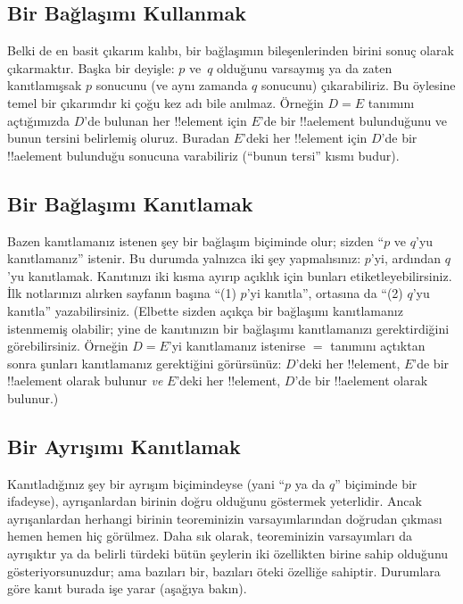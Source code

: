 \subsection{Bir Bağlaşımı Kullanmak}

Belki de en basit çıkarım kalıbı, bir bağlaşımın bileşenlerinden birini
sonuç olarak çıkarmaktır. Başka bir deyişle: $p$ ve~$q$ olduğunu
varsaymış ya da zaten kanıtlamışsak $p$ sonucunu (ve aynı zamanda $q$
sonucunu) çıkarabiliriz. Bu öylesine temel bir çıkarımdır ki çoğu kez
adı bile anılmaz. Örneğin $D = E$ tanımını açtığımızda $D$'de bulunan
her !!{element} için $E$'de bir !!a{element} bulunduğunu ve bunun
tersini belirlemiş oluruz. Buradan $E$'deki her !!{element} için $D$'de
bir !!a{element} bulunduğu sonucuna varabiliriz (``bunun tersi'' kısmı budur).

\subsection{Bir Bağlaşımı Kanıtlamak}

Bazen kanıtlamanız istenen şey bir bağlaşım biçiminde olur; sizden
``$p$ ve $q$'yu kanıtlamanız'' istenir. Bu durumda yalnızca iki şey
yapmalısınız: $p$'yi, ardından $q$'yu kanıtlamak. Kanıtınızı iki kısma
ayırıp açıklık için bunları etiketleyebilirsiniz. İlk notlarınızı
alırken sayfanın başına ``(1) $p$'yi kanıtla'', ortasına da ``(2)
$q$'yu kanıtla'' yazabilirsiniz. (Elbette sizden açıkça bir bağlaşımı
kanıtlamanız istenmemiş olabilir; yine de kanıtınızın bir bağlaşımı
kanıtlamanızı gerektirdiğini görebilirsiniz. Örneğin $D = E$'yi
kanıtlamanız istenirse $=$ tanımını açtıktan sonra şunları kanıtlamanız
gerektiğini görürsünüz: $D$'deki her !!{element}, $E$'de bir
!!a{element} olarak bulunur \emph{ve} $E$'deki her !!{element}, $D$'de
bir !!a{element} olarak bulunur.)

\subsection{Bir Ayrışımı Kanıtlamak}

Kanıtladığınız şey bir ayrışım biçimindeyse (yani ``$p$ ya da $q$''
biçiminde bir ifadeyse), ayrışanlardan birinin doğru olduğunu göstermek
yeterlidir. Ancak ayrışanlardan herhangi birinin teoreminizin
varsayımlarından doğrudan çıkması hemen hemen hiç görülmez. Daha sık
olarak, teoreminizin varsayımları da ayrışıktır ya da belirli türdeki
bütün şeylerin iki özellikten birine sahip olduğunu gösteriyorsunuzdur;
ama bazıları bir, bazıları öteki özelliğe sahiptir. Durumlara göre kanıt
burada işe yarar (aşağıya bakın).

